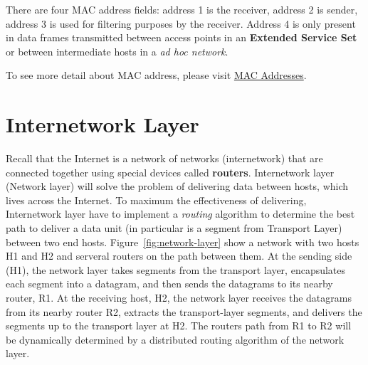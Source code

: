 \documentclass[a4paper, 11pt]{article}
\begin{document}
There are four MAC address fields: address 1 is the receiver, address 2 is sender, address 3 is used for filtering purposes by the receiver. Address 4 is only present in data frames transmitted between access points in an \textbf{Extended Service Set} or between intermediate hosts in a \textit{ad hoc network}.

To see more detail about MAC address, please visit \href{https://networkengineering.stackexchange.com/questions/25100/four-layer-2-addresses-in-802-11-frame-header}{MAC Addresses}.\\

\clearpage
\section{Internetwork Layer}

Recall that the Internet is a network of networks (internetwork) that are connected together using special devices called \textbf{routers}. Internetwork layer (Network layer) will solve the problem of delivering data between hosts, which lives across the Internet. To maximum the effectiveness of delivering, Internetwork layer have to implement a \textit{routing} algorithm to determine the best path to deliver a data unit (in particular is a segment from Transport Layer) between two end hosts. Figure~\ref{fig:network-layer} show a network with two hosts H1 and H2 and serveral routers on the path between them. At the sending side (H1), the network layer takes segments from the transport layer, encapsulates each segment into a datagram, and then sends the datagrams to its nearby router, R1. At the receiving host, H2, the network layer receives the datagrams from its nearby router R2, extracts the transport-layer segments, and delivers the segments up to the transport layer at H2. The routers path from R1 to R2 will be dynamically determined by a distributed routing algorithm of the network layer.\\
\end{document}
